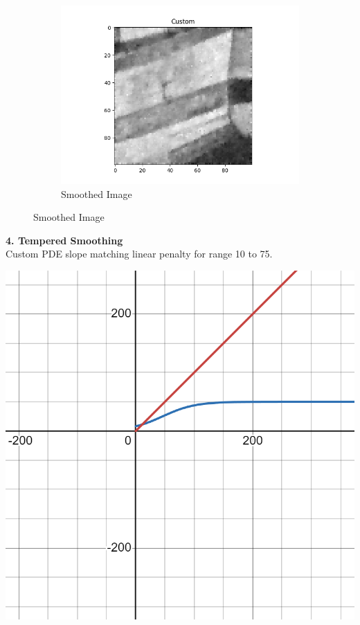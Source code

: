 \documentclass{article}
\begin{document}
\begin{center}
\begin{figure}[!htb]
\begin{center}
        \begin{subfigure}[b]{0.3\textwidth}
          \includegraphics[width=\textwidth]{../generated_images/Custom_test3.png}
          \caption{Smoothed Image}
        \end{subfigure}
      \end{center}
    \end{figure}
  \end{center}

  \newpage
  \noindent
  \textbf{4. Tempered Smoothing}\\
  Custom PDE slope matching linear penalty for range 10 to 75.\\
  \begin{center}
    \includegraphics[scale=0.1]{../report_images/tempered_smoothing.png}\\
  \end{center}
\end{document}
